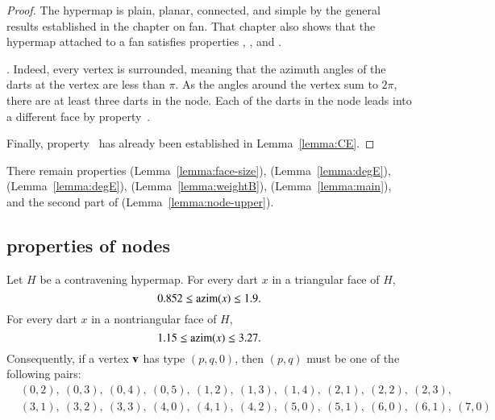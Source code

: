 \begin{proof}
The hypermap is plain, planar, connected, and simple by the general results established in the chapter on fan.  That chapter also shows that the hypermap attached to a fan satisfies properties , , and .

.  Indeed, every vertex is surrounded, meaning that the azimuth angles of the darts at the vertex are less than $\pi$.  As the angles around the vertex sum to $2\pi$, there are at least three darts in the node. Each of the darts in the node leads into a different face by property~.

Finally, property~ has already been established in Lemma~\ref{lemma:CE}.
\end{proof}

There remain properties  (Lemma~\ref{lemma:face-size}), %
 (Lemma~\ref{lemma:degE}),   (Lemma~\ref{lemma:degE}),  (Lemma~\ref{lemma:weightB}),  (Lemma~\ref{lemma:main}), 
and the second part of  (Lemma~\ref{lemma:node-upper}).


\subsection{properties of nodes}
%



\begin{lemma} \label{lemma:0.852}
Let $H$ be a contravening
hypermap. For every dart $x$ in a triangular face of $H$,
    $$0.852\le {\operatorname{azim}}(x)\le 1.9.$$
For every dart $x$ in a nontriangular face of $H$, 
    $$1.15\le{\operatorname{azim}}(x)\le 3.27.$$
%
%
%
Consequently, if a vertex ${\mathbf v}$ has type $(p,q,0)$, then $(p,q)$
must be one of the following pairs:
$$
\begin{array}{lll}
&(0,2),~(0,3),~(0,4),~(0,5),~(1,2),~(1,3),~(1,4),~(2,1),~(2,2),~(2,3),\\
&(3,1),~(3,2),~(3,3),~(4,0),~(4,1),~(4,2),~(5,0),~(5,1),~(6,0),~(6,1),~(7,0)
\end{array}
$$
\end{lemma}
 
